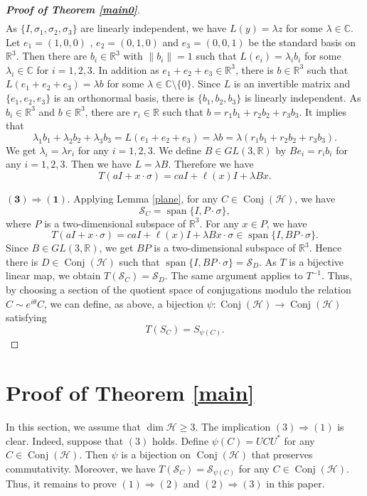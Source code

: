 \documentclass[11pt]{amsart}
\theoremstyle{remark}
\newcommand{\cH}{{\mathcal{H}}}
\newcommand{\SC}{\mathcal{S}_C}
\newcommand{\Conj}{\operatorname{Conj}(\cH)}
\newcommand{\Span}{\operatorname{span}}
\begin{document}
\begin{proof}[{\textbf {Proof of Theorem \ref{main0}}}]
\begin{multline*}
\end{multline*}
As $\{I, \sigma_1, \sigma_2, \sigma_3\}$ are linearly independent,  we have $L(y)=\lambda z$ for some $\lambda \in \mathbb{C}$. Let $e_1=(1,0,0)$ , $e_2=(0,1,0)$ and $e_3=(0,0,1)$ be the standard basis on $\mathbb{R}^3$. Then there are $b_i \in \mathbb{R}^3$ with $\|b_i\|=1$ such that $L(e_i)=\lambda_i b_i$ for some $\lambda_i \in \mathbb{C}$ for $i=1,2,3$. 
In addition as $e_1+e_2+e_3 \in \mathbb{R}^3$, there is $b \in \mathbb{R}^3$ such that $L(e_1+e_2+e_3)=\lambda b$ for some $\lambda \in \mathbb{C}\setminus\{0\}$. Since $L$  is an invertible matrix and $\{e_1, e_2, e_3\}$  is an orthonormal basis, there is $\{b_1, b_2, b_3\}$ is linearly independent. As $b_i \in \mathbb{R}^3$ and $b \in \mathbb{R}^3$, there are $r_i \in \mathbb{R}$ such that $b=r_1b_1+r_2b_2+r_3b_3$. It implies that
\[
\lambda_1 b_1+\lambda_2 b_2+\lambda_3 b_3=L(e_1+e_2+e_3)=\lambda b= \lambda (r_1b_1+r_2b_2+r_3b_3).
\]
We get $\lambda_i=\lambda r_i$ for any $i=1,2,3$. We define $B \in GL(3,\mathbb{R})$ by $Be_i=r_ib_i$ for any $i=1,2,3$. Then we have $L=\lambda B$. Therefore we have
\[
T(aI+x\cdot \sigma)=c aI+\ell(x)I+\lambda Bx.
\] 

$\bm{(3) \Rightarrow (1)}.$
Applying Lemma \ref{plane}, for any $C \in \Conj$, we have 
\[
\SC=\Span\{I, P\cdot\sigma\},  
\]
where $P$ is a  two-dimensional subspace of $\mathbb{R}^3$. For any $x \in P$, we have
\[
T(aI+x \cdot \sigma)=c aI+\ell(x)I+\lambda Bx \cdot \sigma \in \Span\{ I, BP \cdot \sigma\}.
\]
Since $B \in GL(3, \mathbb{R})$, we get $BP$  is a  two-dimensional subspace of $\mathbb{R}^3$. Hence there is $D \in \Conj$ such that $\Span\{ I, BP \cdot \sigma\}=\mathcal{S}_D$. As $T$ is a bijective linear map, we obtain $T(\SC)=\mathcal{S}_D$. The same argument applies to $T^{-1}$. Thus, by choosing a section of the quotient space of conjugations modulo the relation $C\sim e^{i\theta}C$, we can define, as above, a bijection $\psi:\Conj \to \Conj$ satisfying
\[
T(S_C)=S_{\psi(C)}.
\]


\end{proof}


\section{Proof of Theorem \ref{main}}
In this section, we assume that $\dim \cH \ge 3$. The implication $(3)\Rightarrow(1)$ is clear. Indeed, suppose that $(3)$ holds. Define $\psi(C)=UCU^{*}$ for any $C \in \Conj$. Then $\psi$ is a bijection on $\Conj$ that preserves commutativity. Moreover, we have  $T(\SC)=\mathcal{S}_{\psi(C)}$ for any $C \in \Conj$.
Thus, it remains to prove $(1)\Rightarrow(2)$ and $(2)\Rightarrow(3)$ in this paper.  
\end{document}
